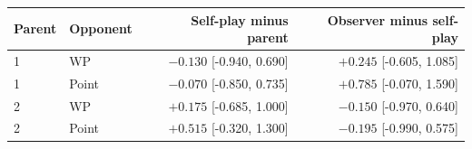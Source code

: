 \begin{tabular}{llrr}
\toprule
Parent & Opponent & Self-play minus parent & Observer minus self-play \\
\midrule
1 & WP & $-0.130$ [-0.940, 0.690] & $+0.245$ [-0.605, 1.085] \\
1 & Point & $-0.070$ [-0.850, 0.735] & $+0.785$ [-0.070, 1.590] \\
2 & WP & $+0.175$ [-0.685, 1.000] & $-0.150$ [-0.970, 0.640] \\
2 & Point & $+0.515$ [-0.320, 1.300] & $-0.195$ [-0.990, 0.575] \\
\bottomrule
\end{tabular}
